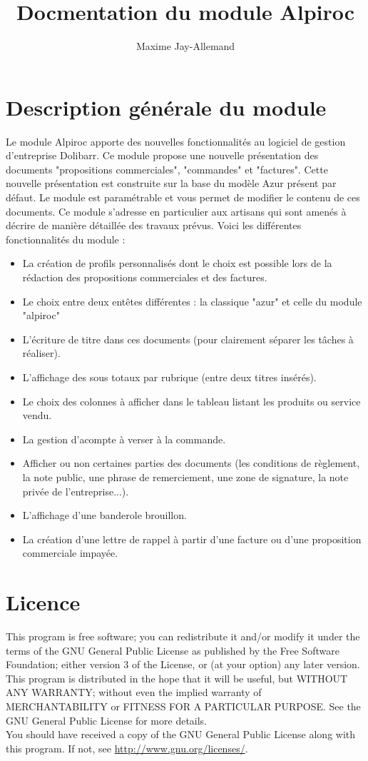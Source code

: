 \documentclass[a4paper,11pt]{article}
\title{Docmentation du module Alpiroc}
\author{Maxime Jay-Allemand}
\begin{document}
\maketitle

\section{Description générale du module}
Le module Alpiroc apporte des nouvelles fonctionnalités au logiciel de gestion d'entreprise Dolibarr. Ce module propose une nouvelle présentation des documents "propositions commerciales", "commandes" et "factures". Cette nouvelle présentation est construite sur la base du modèle Azur présent par défaut. Le module est paramétrable et vous permet de modifier le contenu de ces documents. Ce module s'adresse en particulier aux artisans qui sont amenés à décrire de manière détaillée des travaux prévus. Voici les différentes fonctionnalités du module :\\
 \begin{itemize}
    \item La création de profils personnalisés dont le choix est possible lors de la rédaction des propositions commerciales et des factures.
    \item Le choix entre deux entêtes différentes : la classique "azur" et celle du module "alpiroc"
    \item L'écriture de titre dans ces documents (pour clairement séparer les tâches à réaliser).
    \item L'affichage des sous totaux par rubrique (entre deux titres insérés).
    \item Le choix des colonnes à afficher dans le tableau listant les produits ou service vendu.
    \item La gestion d'acompte à verser à la commande.
    \item Afficher ou non certaines parties des documents (les conditions de règlement, la note public, une phrase de remerciement, une zone de signature, la note privée de l'entreprise...).
    \item L'affichage d'une banderole brouillon.
    \item La création d'une lettre de rappel à partir d'une facture ou d'une proposition commerciale impayée.
  \end{itemize}
\section{Licence}
This program is free software; you can redistribute it and/or modify it under the terms of the GNU General Public License as published by the Free Software Foundation; either version 3 of the License, or (at your option) any later version.\\
This program is distributed in the hope that it will be useful, but WITHOUT ANY WARRANTY; without even the implied warranty of MERCHANTABILITY or FITNESS FOR A PARTICULAR PURPOSE.  See the GNU General Public License for more details.\\
You should have received a copy of the GNU General Public License along with this program. If not, see \href{http://www.gnu.org/licenses/}{http://www.gnu.org/licenses/}.
\end{document}
